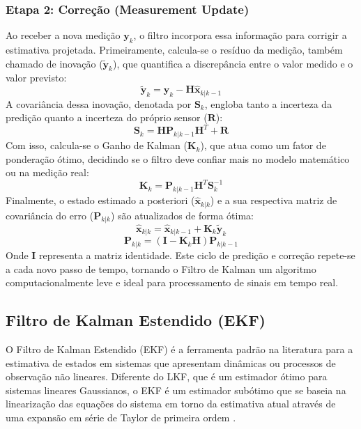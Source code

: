 \documentclass[a4paper,12pt]{article}
\begin{document}
\subsubsection*{Etapa 2: Correção (Measurement Update)}
Ao receber a nova medição $\mathbf{y}_k$, o filtro incorpora essa informação para corrigir a estimativa projetada. Primeiramente, calcula-se o resíduo da medição, também chamado de inovação ($\tilde{\mathbf{y}}_k$), que quantifica a discrepância entre o valor medido e o valor previsto:
\begin{equation}
    \tilde{\mathbf{y}}_k = \mathbf{y}_k - \mathbf{H}\hat{\mathbf{x}}_{k|k-1}
\end{equation}
A covariância dessa inovação, denotada por $\mathbf{S}_k$, engloba tanto a incerteza da predição quanto a incerteza do próprio sensor ($\mathbf{R}$):
\begin{equation}
    \mathbf{S}_k = \mathbf{H}\mathbf{P}_{k|k-1}\mathbf{H}^T + \mathbf{R}
\end{equation}
Com isso, calcula-se o Ganho de Kalman ($\mathbf{K}_k$), que atua como um fator de ponderação ótimo, decidindo se o filtro deve confiar mais no modelo matemático ou na medição real:
\begin{equation}
    \mathbf{K}_k = \mathbf{P}_{k|k-1}\mathbf{H}^T \mathbf{S}_k^{-1}
\end{equation}
Finalmente, o estado estimado a posteriori ($\hat{\mathbf{x}}_{k|k}$) e a sua respectiva matriz de covariância do erro ($\mathbf{P}_{k|k}$) são atualizados de forma ótima:
\begin{equation}
    \hat{\mathbf{x}}_{k|k} = \hat{\mathbf{x}}_{k|k-1} + \mathbf{K}_k \tilde{\mathbf{y}}_k
    \label{eq:kf_corr_estado}
\end{equation}
\begin{equation}
    \mathbf{P}_{k|k} = (\mathbf{I} - \mathbf{K}_k\mathbf{H})\mathbf{P}_{k|k-1}
    \label{eq:kf_corr_covariancia}
\end{equation}
Onde $\mathbf{I}$ representa a matriz identidade. Este ciclo de predição e correção repete-se a cada novo passo de tempo, tornando o Filtro de Kalman um algoritmo computacionalmente leve e ideal para processamento de sinais em tempo real.

\subsection{Filtro de Kalman Estendido (EKF)}
\label{subsec:FiltroEKF}

O Filtro de Kalman Estendido (EKF) é a ferramenta padrão na literatura para a estimativa de estados em sistemas que apresentam dinâmicas ou processos de observação não lineares. Diferente do LKF, que é um estimador ótimo para sistemas lineares Gaussianos, o EKF é um estimador subótimo que se baseia na linearização das equações do sistema em torno da estimativa atual através de uma expansão em série de Taylor de primeira ordem \cite{gelb1974, simon2006}.
\end{document}
